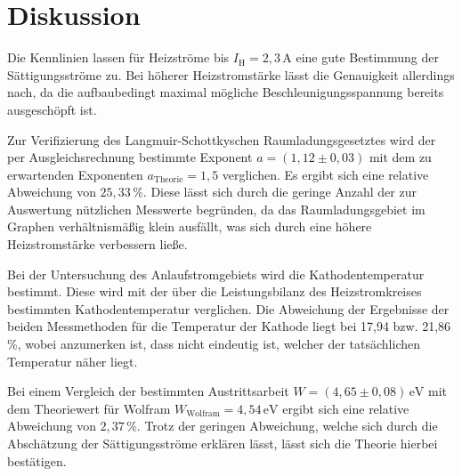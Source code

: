 \section{Diskussion}
\label{sec:Diskussion}

Die Kennlinien lassen für Heizströme bis $I_\text{H} = 2,3\,\si{\ampere}$ eine gute Bestimmung der
Sättigungsströme zu. Bei höherer Heizstromstärke lässt die Genauigkeit allerdings nach, da die aufbaubedingt
maximal mögliche Beschleunigungsspannung bereits ausgeschöpft ist.

\noindent Zur Verifizierung des Langmuir-Schottkyschen Raumladungsgesetztes wird der per Ausgleichsrechnung bestimmte
Exponent $a = (1,12 \pm 0,03)$ mit dem zu erwartenden Exponenten $a_\text{Theorie} = 1,5$ verglichen. Es ergibt sich eine relative
Abweichung von $25,33\,\%$. Diese lässt sich durch die geringe Anzahl der zur Auswertung nützlichen Messwerte begründen,
da das Raumladungsgebiet im Graphen verhältnismäßig klein ausfällt, was sich durch eine höhere Heizstromstärke verbessern ließe.

\noindent Bei der Untersuchung des Anlaufstromgebiets wird die Kathodentemperatur bestimmt. 
Diese wird mit der über die Leistungsbilanz des Heizstromkreises bestimmten Kathodentemperatur verglichen.
Die Abweichung der Ergebnisse der beiden Messmethoden für die Temperatur der Kathode liegt bei 17,94 bzw. 21,86\,\%,
wobei anzumerken ist, dass nicht eindeutig ist, welcher der tatsächlichen Temperatur näher liegt.

\noindent Bei einem Vergleich der bestimmten Austrittsarbeit $W = (4,65 \pm 0,08)\,\si{\eV}$ mit dem Theoriewert
für Wolfram $W_\text{Wolfram} = 4,54\,\si{\eV}$ ergibt sich eine relative Abweichung von $2,37\,\%$. Trotz der
geringen Abweichung, welche sich durch die Abschätzung der Sättigungsströme erklären lässt,
lässt sich die Theorie hierbei bestätigen. 